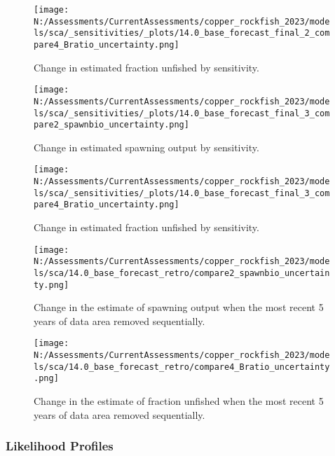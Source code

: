 \documentclass[11pt,
  english,
  letterpaper,
]{article}
\begin{document}
\newpage

\begin{figure}
\centering
\texttt{[image: N:/Assessments/CurrentAssessments/copper\_rockfish\_2023/models/sca/\_sensitivities/\_plots/14.0\_base\_forecast\_final\_2\_compare4\_Bratio\_uncertainty.png]}
\caption{Change in estimated fraction unfished by sensitivity.\label{fig:sens-depl-2}}
\end{figure}

\newpage

\begin{figure}
\centering
\texttt{[image: N:/Assessments/CurrentAssessments/copper\_rockfish\_2023/models/sca/\_sensitivities/\_plots/14.0\_base\_forecast\_final\_3\_compare2\_spawnbio\_uncertainty.png]}
\caption{Change in estimated spawning output by sensitivity.\label{fig:sens-ssb-3}}
\end{figure}

\newpage

\begin{figure}
\centering
\texttt{[image: N:/Assessments/CurrentAssessments/copper\_rockfish\_2023/models/sca/\_sensitivities/\_plots/14.0\_base\_forecast\_final\_3\_compare4\_Bratio\_uncertainty.png]}
\caption{Change in estimated fraction unfished by sensitivity.\label{fig:sens-depl-3}}
\end{figure}

\newpage

\begin{figure}
\centering
\texttt{[image: N:/Assessments/CurrentAssessments/copper\_rockfish\_2023/models/sca/14.0\_base\_forecast\_retro/compare2\_spawnbio\_uncertainty.png]}
\caption{Change in the estimate of spawning output when the most recent 5 years of data area removed sequentially.\label{fig:retro-ssb}}
\end{figure}

\pagebreak

\begin{figure}
\centering
\texttt{[image: N:/Assessments/CurrentAssessments/copper\_rockfish\_2023/models/sca/14.0\_base\_forecast\_retro/compare4\_Bratio\_uncertainty.png]}
\caption{Change in the estimate of fraction unfished when the most recent 5 years of data area removed sequentially.\label{fig:retro-depl}}
\end{figure}

\hypertarget{likelihood-profiles-1}{%
\subsubsection{Likelihood Profiles}\label{likelihood-profiles-1}}
\end{document}
